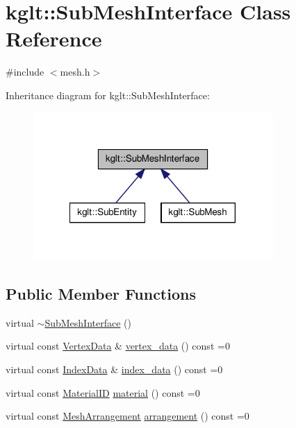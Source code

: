 \hypertarget{classkglt_1_1_sub_mesh_interface}{\section{kglt\-:\-:Sub\-Mesh\-Interface Class Reference}
\label{classkglt_1_1_sub_mesh_interface}
}


{\ttfamily \#include $<$mesh.\-h$>$}



Inheritance diagram for kglt\-:\-:Sub\-Mesh\-Interface\-:\nopagebreak
\begin{figure}[H]
\begin{center}
\leavevmode
\includegraphics[width=258pt]{classkglt_1_1_sub_mesh_interface__inherit__graph}
\end{center}
\end{figure}
\subsection*{Public Member Functions}
\begin{DoxyCompactItemize}
\item 
virtual \hyperlink{classkglt_1_1_sub_mesh_interface_a1a93d1e8de546e18ac99c70162269537}{$\sim$\-Sub\-Mesh\-Interface} ()
\item 
virtual const \hyperlink{classkglt_1_1_vertex_data}{Vertex\-Data} \& \hyperlink{classkglt_1_1_sub_mesh_interface_a5ec394f1ae5e362832968a5528a287ec}{vertex\-\_\-data} () const =0
\item 
virtual const \hyperlink{classkglt_1_1_index_data}{Index\-Data} \& \hyperlink{classkglt_1_1_sub_mesh_interface_a7ba1f57fffc2f289e6580f5b63ec869d}{index\-\_\-data} () const =0
\item 
virtual const \hyperlink{namespacekglt_a5ffac6377a7d3e163b4d5c31f71db43a}{Material\-I\-D} \hyperlink{classkglt_1_1_sub_mesh_interface_af77b02a088b0310da4cd1e6517fa3f78}{material} () const =0
\item 
virtual const \hyperlink{namespacekglt_a4d5a692708f38d0176dd6f5d341289da}{Mesh\-Arrangement} \hyperlink{classkglt_1_1_sub_mesh_interface_ad94eff60d646d22d535f09d65ff45743}{arrangement} () const =0
\end{DoxyCompactItemize}


